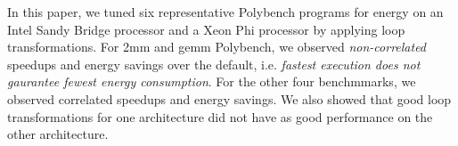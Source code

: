 In this paper, we tuned six representative Polybench programs for energy on
an Intel Sandy Bridge processor and a Xeon Phi processor by applying loop 
transformations. For 2mm and gemm Polybench, we observed \emph{non-correlated}
speedups and energy savings over the default, i.e. \emph{fastest execution does not
gaurantee fewest energy consumption}. For the other four benchmmarks, 
we observed correlated speedups and energy savings.
We also showed that good loop transformations for one architecture did 
not have as good performance on the other architecture.
